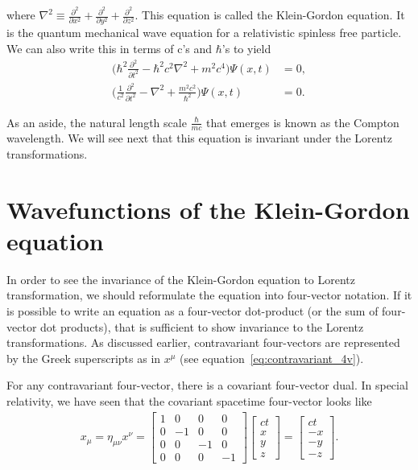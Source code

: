 \documentclass[titlepage,letterpaper,onecolumn,11pt,final]{report}
\numberwithin{equation}{section}
\numberwithin{figure}{section}
\begin{document}
where $\nabla^{2} \equiv \frac{\partial^2}{\partial x^2} + \frac{\partial^2}{\partial y^2} + \frac{\partial^2}{\partial z^2}$. This equation is called the Klein-Gordon equation. It is the quantum mechanical wave equation for a relativistic spinless free particle. We can also write this in terms of c's and $\hbar$'s to yield
\begin{subequations}
\begin{align}
	\bigg( \hbar^{2} \frac{\partial^{2}}{\partial t^{2}} - \hbar^{2} c^{2} \nabla^{2} + m^{2} c^{4} \bigg) \Psi (x,t) &= 0, \\
	\bigg( \frac{1}{c^{2}} \frac{\partial^{2}}{\partial t^{2}} - \nabla^{2} + \frac{m^{2} c^{2}}{\hbar^{2}} \bigg) \Psi (x,t) &= 0.
\end{align}
\end{subequations}

As an aside, the natural length scale $\frac{\hbar}{m c}$ that emerges is known as the Compton wavelength. We will see next that this equation is invariant under the Lorentz transformations. 

\section{Wavefunctions of the Klein-Gordon equation}

In order to see the invariance of the Klein-Gordon equation to Lorentz transformation, we should reformulate the equation into four-vector notation. If it is possible to write an equation as a four-vector dot-product (or the sum of four-vector dot products), that is sufficient to show invariance to the Lorentz transformations. As discussed earlier, contravariant four-vectors are represented by the Greek superscripts as in $x^{\mu}$ (see equation~\ref{eq:contravariant_4v}).

For any contravariant four-vector, there is a covariant four-vector dual. In special relativity, we have seen that the covariant spacetime four-vector looks like
\begin{gather}
	\label{eq:covariant_4v}
	x_{\mu}
	= \eta_{\mu \nu} x^{\nu} =
	\begin{bmatrix}
		1  & 0 & 0 & 0 \\[6pt]
		0  & -1& 0 & 0 \\[6pt]
		0  & 0 & -1& 0 \\[6pt]
		0  & 0 & 0 & -1
	\end{bmatrix}
	\begin{bmatrix}
		c t \\[6pt]
		x  \\[6pt]
		y  \\[6pt]
		z 
	\end{bmatrix}
	=
	\begin{bmatrix}
		c t \\[6pt]
		-x \\[6pt]
		-y \\[6pt]
		-z
	\end{bmatrix}
	.
\end{gather}
 
\end{document}
